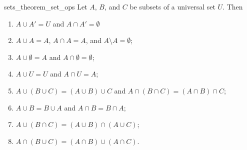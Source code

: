 \begin{prop}{sets_theorem_set_ops}
Let $A$, $B$, and $C$ be subsets of a universal set $U$. Then
\begin{enumerate}
 
\item
$A \cup A' = U$ and $A \cap A' = \emptyset$

\item
$A \cup A = A$, $A \cap A = A$, and $A \setminus A = \emptyset$;
 
\item
$A \cup \emptyset = A$ and $A \cap \emptyset = \emptyset$;

\item
$A \cup U = U$ and $A \cap U = A$;
 
\item
$A \cup (B \cup C) = (A \cup B) \cup C$ and  $A \cap (B \cap C) = (A \cap B) \cap C$;
 
\item
$A \cup B = B \cup A$ and $A \cap B = B \cap A$;
 
\item
$A \cup (B \cap C) = (A \cup B) \cap (A \cup C)$;
 
\item
$A \cap (B \cup C) = (A \cap B) \cup (A \cap C)$.
 
\end{enumerate}
\end{prop}


